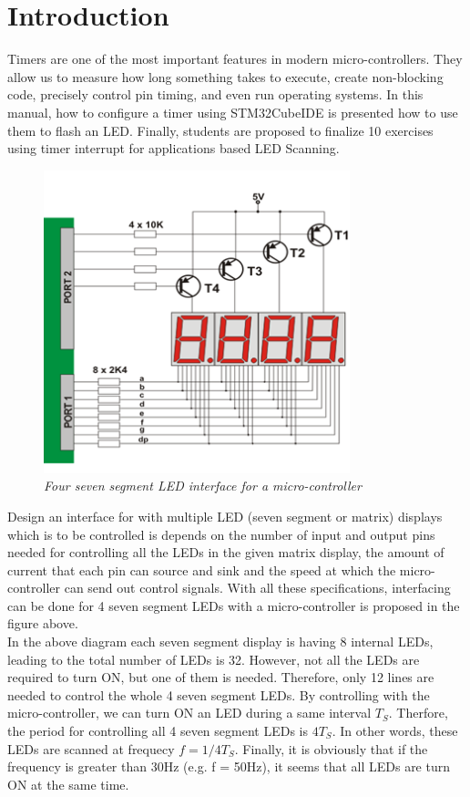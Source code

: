 
\section{Introduction}
Timers are one of the most important features in modern micro-controllers. They allow us to measure how long something takes to execute, create non-blocking code, precisely control pin timing, and even run operating systems. In this manual, how to configure a timer using STM32CubeIDE is presented how to use them to flash an LED. Finally, students are proposed to finalize 10 exercises using timer interrupt for applications based LED Scanning.

\begin{figure}[!htp]
    \centering
    \includegraphics[width=3.5in]{source/picture/bai_2/led_scanning1.png}
    \caption{\textit{Four seven segment LED interface for a micro-controller}}
    \label{bai2_intro1}
\end{figure}


Design an interface for with multiple LED (seven segment or matrix) displays which is to be controlled is depends on the number of input and output pins needed for controlling all the LEDs in the given matrix display, the amount of current that each pin can source and sink and the speed at which the micro-controller can send out control signals. With all these specifications, interfacing can be done for 4 seven segment LEDs with a micro-controller is proposed in the figure above. \\


In the above diagram each seven segment display is having 8 internal LEDs, leading to the total number of LEDs is 32. However, not all the LEDs are required to turn ON, but one of them is needed. Therefore, only 12 lines are needed to control the whole 4 seven segment LEDs.   By controlling with the micro-controller, we can turn ON an LED during a same interval \textbf{$T_S$}. Therfore, the period for controlling all 4 seven segment LEDs is \textbf{$4T_S$}. In other words, these LEDs are scanned at frequecy \textbf{$f = 1 / 4T_S$}. Finally, it is obviously that if the frequency is greater than 30Hz (e.g. f = 50Hz), it seems that all LEDs are turn ON at the same time.\\

